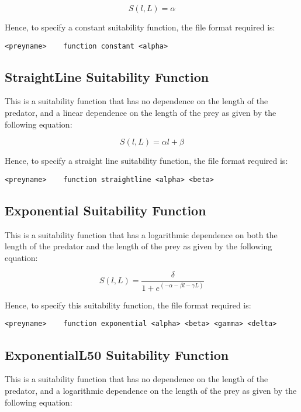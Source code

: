 \documentclass[10pt,twoside]{book}
\begin{document}
\begin{equation}\label{eq:constsuit}
S(l, L) = \alpha
\end{equation}

Hence, to specify a constant suitability function, the file format required is:

{\small\begin{verbatim}
<preyname>    function constant <alpha>
\end{verbatim}}

\subsection{StraightLine Suitability Function}
This is a suitability function that has no dependence on the length of the predator, and a linear dependence on the length of the prey as given by the following equation:

\begin{equation}\label{eq:straightsuit}
S(l, L) = \alpha l + \beta
\end{equation}

Hence, to specify a straight line suitability function, the file format required is:

{\small\begin{verbatim}
<preyname>    function straightline <alpha> <beta>
\end{verbatim}}

\subsection{Exponential Suitability Function}
This is a suitability function that has a logarithmic dependence on both the length of the predator and the length of the prey as given by the following equation:

\begin{equation}\label{eq:expsuit}
S(l, L) = {\frac{\delta}{1 + e^{(- \alpha - \beta l - \gamma  L)}}}
\end{equation}

Hence, to specify this suitability function, the file format required is:

{\small\begin{verbatim}
<preyname>    function exponential <alpha> <beta> <gamma> <delta>
\end{verbatim}}

\subsection{ExponentialL50 Suitability Function}
This is a suitability function that has no dependence on the length of the predator, and a logarithmic dependence on the length of the prey as given by the following equation:
\end{document}
